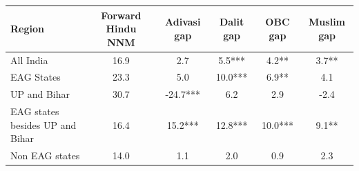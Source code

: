 \begin{tabular}{lccccc}
\hline
Region & Forward Hindu NNM & Adivasi gap & Dalit gap & OBC gap & Muslim gap \\
\hline
All India&16.9&2.7&5.5***&4.2**&3.7**\\
EAG States&23.3&5.0&10.0***&6.9**&4.1\\
UP and Bihar&30.7&-24.7***&6.2&2.9&-2.4\\
EAG states besides UP and Bihar&16.4&15.2***&12.8***&10.0***&9.1**\\
Non EAG states&14.0&1.1&2.0&0.9&2.3\\
\hline
\end{tabular}
